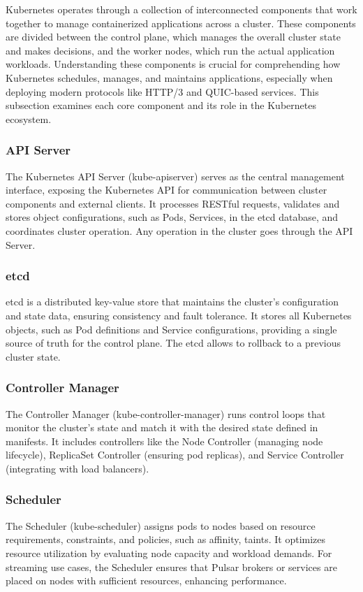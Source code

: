 Kubernetes operates through a collection of interconnected components that work together to manage containerized applications across a cluster. These components are divided between the control plane, which manages the overall cluster state and makes decisions, and the worker nodes, which run the actual application workloads. Understanding these components is crucial for comprehending how Kubernetes schedules, manages, and maintains applications, especially when deploying modern protocols like HTTP/3 and QUIC-based services. This subsection examines each core component and its role in the Kubernetes ecosystem.

\subsubsection{API Server}
The Kubernetes API Server (kube-apiserver) serves as the central management interface, exposing the Kubernetes API for communication between cluster components and external clients. It processes RESTful requests, validates and stores object configurations, such as Pods, Services, in the etcd database, and coordinates cluster operation. Any operation in the cluster goes through the API Server.

\subsubsection{etcd}
etcd is a distributed key-value store that maintains the cluster's configuration and state data, ensuring consistency and fault tolerance. It stores all Kubernetes objects, such as Pod definitions and Service configurations, providing a single source of truth for the control plane. The etcd allows to rollback to a previous cluster state.

\subsubsection{Controller Manager}
The Controller Manager (kube-controller-manager) runs control loops that monitor the cluster's state and match it with the desired state defined in manifests. It includes controllers like the Node Controller (managing node lifecycle), ReplicaSet Controller (ensuring pod replicas), and Service Controller (integrating with load balancers). 

\subsubsection{Scheduler}
The Scheduler (kube-scheduler) assigns pods to nodes based on resource requirements, constraints, and policies, such as affinity, taints. It optimizes resource utilization by evaluating node capacity and workload demands. For streaming use cases, the Scheduler ensures that Pulsar brokers or services are placed on nodes with sufficient resources, enhancing performance.

